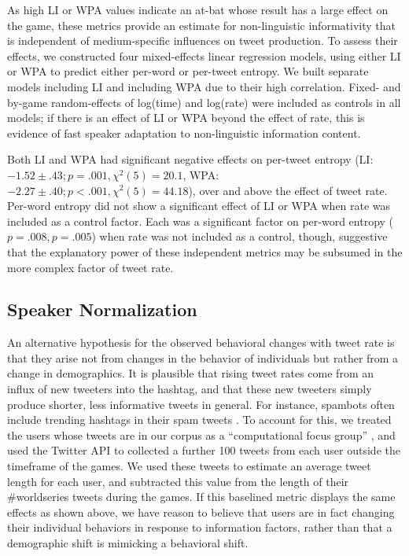 \documentclass[11pt,letterpaper]{article}
\begin{document}
As high LI or WPA values indicate an at-bat whose result has a large effect on the game, these metrics provide an estimate for non-linguistic informativity that is independent of medium-specific influences on tweet production.  To assess their effects, we constructed four mixed-effects linear regression models, using either LI or WPA to predict either per-word or per-tweet entropy.  We built separate models including LI and including WPA due to their high correlation. Fixed- and by-game random-effects of log(time) and log(rate) were included as controls in all models; if there is an effect of LI or WPA beyond the effect of rate, this is evidence of fast speaker adaptation to non-linguistic information content.

Both LI and WPA had significant negative effects on per-tweet entropy (LI: $-1.52 \pm .43; p=.001, \chi^2(5)=20.1$, WPA: $-2.27 \pm .40; p<.001, \chi^2(5)=44.18$), over and above the effect of tweet rate.  Per-word entropy did not show a significant effect of LI or WPA when rate was included as a control factor. Each was a significant factor on per-word entropy ($p=.008,p=.005$) when rate was not included as a control, though, suggestive that the explanatory power of these independent metrics may be subsumed in the more complex factor of tweet rate.

\subsection{Speaker Normalization}

An alternative hypothesis for the observed behavioral changes with tweet rate is that they arise not from changes in the behavior of individuals but rather from a change in demographics.  It is plausible that rising tweet rates come from an influx of new tweeters into the hashtag, and that these new tweeters simply produce shorter, less informative tweets in general.  For instance, spambots often include trending hashtags in their spam tweets \cite{martinez2013}. To account for this, we treated the users whose tweets are in our corpus as a ``computational focus group'' \cite{lin2013,lin2014}, and used the Twitter API to collected a further 100 tweets from each user outside the timeframe of the games.  We used these tweets to estimate an average tweet length for each user, and subtracted this value from the length of their \#worldseries tweets during the games.  If this baselined metric displays the same effects as shown above, we have reason to believe that users are in fact changing their individual behaviors in response to information factors, rather than that a demographic shift is mimicking a behavioral shift.
\end{document}
